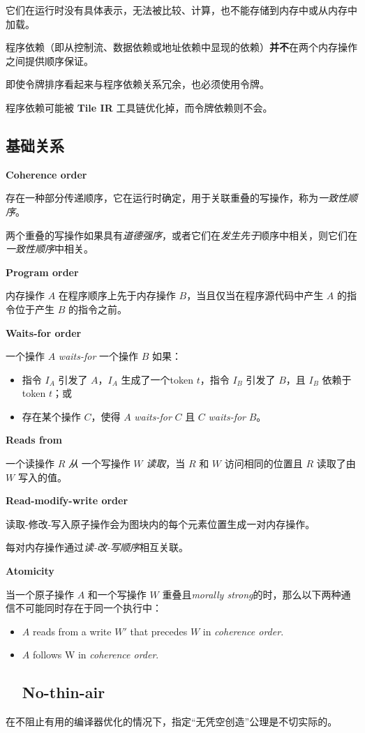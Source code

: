 \documentclass{article}
\begin{document}
它们在运行时没有具体表示，无法被比较、计算，也不能存储到内存中或从内存中加载。


程序依赖（即从控制流、数据依赖或地址依赖中显现的依赖）\textbf{并不}在两个内存操作之间提供顺序保证。

即使令牌排序看起来与程序依赖关系冗余，也必须使用令牌。

程序依赖可能被 \textbf{Tile IR} 工具链优化掉，而令牌依赖则不会。



\subsection{基础关系}

\textbf{Coherence order}


存在一种部分传递顺序，它在运行时确定，用于关联重叠的写操作，称为\textit{一致性顺序}。

两个重叠的写操作如果具有\textit{道德强序}，或者它们在\textit{发生先于}顺序中相关，则它们在\textit{一致性顺序}中相关。


\textbf{Program order}


内存操作 $A$ 在程序顺序上先于内存操作 $B$，当且仅当在程序源代码中产生 $A$ 的指令位于产生 $B$ 的指令之前。


\textbf{Waits-for order}


一个操作 $A$ \textit{waits-for} 一个操作 $B$ 如果：

\begin{itemize}
\item 指令 $I_A$ 引发了 $A$，$I_A$ 生成了一个token $t$，指令 $I_B$ 引发了 $B$，且 $I_B$ 依赖于token $t$；或
\item 存在某个操作 $C$，使得 $A$ \textit{waits-for} $C$ 且 $C$ \textit{waits-for} $B$。

\end{itemize}
\textbf{Reads from}


一个读操作 $R$ \textit{从} 一个写操作 $W$ \textit{读取}，当 $R$ 和 $W$ 访问相同的位置且 $R$ 读取了由 $W$ 写入的值。


\textbf{Read-modify-write order}


读取-修改-写入原子操作会为图块内的每个元素位置生成一对内存操作。

每对内存操作通过\textit{读-改-写顺序}相互关联。


\textbf{Atomicity}


当一个原子操作 $A$ 和一个写操作 $W$ 重叠且\textit{morally strong}的时，那么以下两种通信不可能同时存在于同一个执行中：


\begin{itemize}
\item $A$ reads from a write $W'$ that precedes $W$ in \textit{coherence order}.
\item $A$ follows W in \textit{coherence order}.


\subsection{No-thin-air}

\end{itemize}
在不阻止有用的编译器优化的情况下，指定``无凭空创造''公理是不切实际的。
\end{document}
